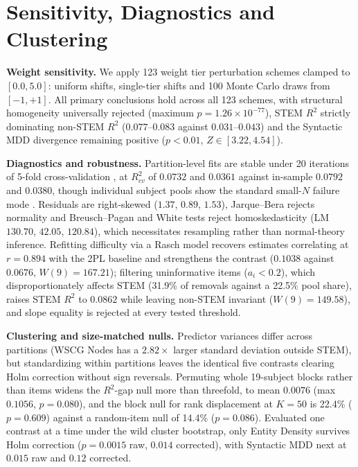 \appendix
\setcounter{table}{0}\setcounter{figure}{0}
\renewcommand{\thetable}{A\arabic{table}}
\renewcommand{\thefigure}{A\arabic{figure}}
\makeatletter{}\makeatother

\section{Sensitivity, Diagnostics and Clustering}\label{sec:sensitivity}

\textbf{Weight sensitivity.} We apply 123 weight tier perturbation schemes clamped to $[0.0,5.0]$: uniform shifts, single-tier shifts and 100 Monte Carlo draws from $[-1,+1]$. All primary conclusions hold across all 123 schemes, with structural homogeneity universally rejected (maximum $p = 1.26 \times 10^{-77}$), STEM $R^{2}$ strictly dominating non-STEM $R^{2}$ ($0.077$--$0.083$ against $0.031$--$0.043$) and the Syntactic MDD divergence remaining positive ($p < 0.01$, $Z \in [3.22,4.54]$).

\textbf{Diagnostics and robustness.}\label{sec:robustness} Partition-level fits are stable under 20 iterations of 5-fold cross-validation \citep{stone1974}, at $R_{cv}^{2}$ of $0.0732$ and $0.0361$ against in-sample $0.0792$ and $0.0380$, though individual subject pools show the standard small-$N$ failure mode \citep{babyak2004,yarkoni2017}. Residuals are right-skewed ($1.37$, $0.89$, $1.53$), Jarque--Bera rejects normality and Breusch--Pagan \citep{breusch1979} and White \citep{white1980} tests reject homoskedasticity (LM $130.70$, $42.05$, $120.84$), which necessitates resampling rather than normal-theory inference. Refitting difficulty via a Rasch model \citep{rasch1960} recovers estimates correlating at $r = 0.894$ with the 2PL baseline and strengthens the contrast ($0.1038$ against $0.0676$, $W(9) = 167.21$); filtering uninformative items ($a_{i} < 0.2$), which disproportionately affects STEM (31.9\% of removals against a 22.5\% pool share), raises STEM $R^{2}$ to $0.0862$ while leaving non-STEM invariant ($W(9) = 149.58$), and slope equality is rejected at every tested threshold.

\textbf{Clustering and size-matched nulls.}\label{sec:clustered} Predictor variances differ across partitions (WSCG Nodes has a $2.82\times$ larger standard deviation outside STEM), but standardizing within partitions leaves the identical five contrasts clearing Holm correction without sign reversals. Permuting whole 19-subject blocks rather than items widens the $R^{2}$-gap null more than threefold, to mean $0.0076$ (max $0.1056$, $p = 0.080$), and the block null for rank displacement at $K = 50$ is 22.4\% ($p = 0.609$) against a random-item null of 14.4\% ($p = 0.086$). Evaluated one contrast at a time under the wild cluster bootstrap, only Entity Density survives Holm correction ($p = 0.0015$ raw, $0.014$ corrected), with Syntactic MDD next at $0.015$ raw and $0.12$ corrected.

